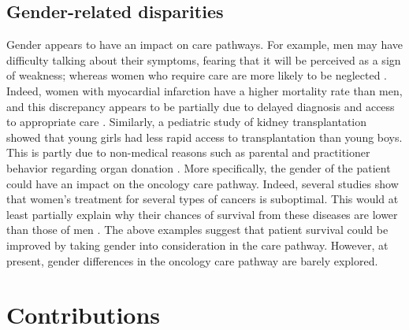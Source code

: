 \subsection*{Gender-related disparities}

Gender appears to have an impact on care pathways. For example, men may have
difficulty talking about their symptoms, fearing that it will be perceived as a
sign of weakness; whereas women who require care are more likely to be neglected
\cite{ferrari_gender_2018}. Indeed, women with myocardial infarction have a
higher mortality rate than men, and this discrepancy appears to be partially due
to delayed diagnosis and access to appropriate care
\cite{bugiardini_delayed_2017}. Similarly, a pediatric study of kidney
transplantation showed that young girls had less rapid access to transplantation
than young boys. This is partly due to non-medical reasons such as parental and
practitioner behavior regarding organ donation \cite{hogan_j_gender_2016}. More
specifically, the gender of the patient could have an impact on the oncology
care pathway. Indeed, several studies show that women's treatment for several
types of cancers is suboptimal. This would at least partially explain why their
chances of survival from these diseases are lower than those of men
\cite{park_a_undertreatment_2019,carter_paulson_e_gender_2009,rose_sex_2016}.
The above examples suggest that patient survival could be improved by taking
gender into consideration in the care pathway. However, at present, gender
differences in the oncology care pathway are barely explored.



\section{Contributions}
